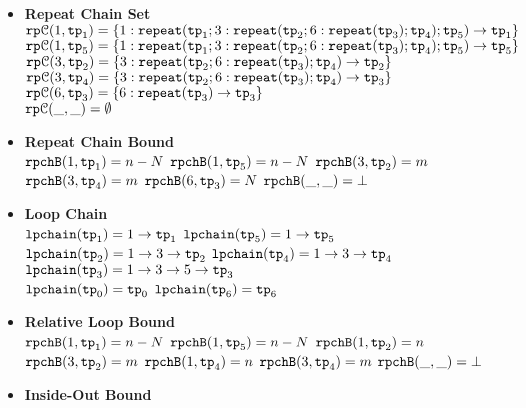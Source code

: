 \begin{enumerate}
{\begin{itemize}
  \item \textbf{Repeat Chain Set}
  \\
  $\mathtt{rp}\mathcal{C}(1, \mathtt{tp}_1) = 
  \{1: \mathtt{repeat}(\mathtt{tp}_1; 3: \mathtt{repeat}(\mathtt{tp}_2; 6 : \mathtt{repeat}(\mathtt{tp}_3); \mathtt{tp}_4); \mathtt{tp}_5) \to \mathtt{tp}_1\}$
  \\
  $\mathtt{rp}\mathcal{C}(1, \mathtt{tp}_5) = \{1: \mathtt{repeat}(\mathtt{tp}_1; 3: \mathtt{repeat}(\mathtt{tp}_2; 6 : \mathtt{repeat}(\mathtt{tp}_3); \mathtt{tp}_4); \mathtt{tp}_5) \to \mathtt{tp}_5\}$
  \\
  $\mathtt{rp}\mathcal{C}(3, \mathtt{tp}_2) = \{3: \mathtt{repeat}(\mathtt{tp}_2; 6 : \mathtt{repeat}(\mathtt{tp}_3); \mathtt{tp}_4) \to \mathtt{tp}_2\}$
  \\
  $\mathtt{rp}\mathcal{C}(3, \mathtt{tp}_4) = \{3: \mathtt{repeat}(\mathtt{tp}_2; 6 : \mathtt{repeat}(\mathtt{tp}_3); \mathtt{tp}_4) \to \mathtt{tp}_3\}$
  \\
  $\mathtt{rp}\mathcal{C}(6, \mathtt{tp}_3) = \{6: \mathtt{repeat}(\mathtt{tp}_3) \to \mathtt{tp}_3\}$
  \\
  $\mathtt{rp}\mathcal{C}(\_, \_) = \emptyset$ 
  \item \textbf{Repeat Chain Bound}
  \\
  $\mathtt{rpchB}(1, \mathtt{tp}_1) = n - N$ \quad
  $\mathtt{rpchB}(1, \mathtt{tp}_5) = n - N$ \quad
  $\mathtt{rpchB}(3, \mathtt{tp}_2) = m$ \\
  $\mathtt{rpchB}(3, \mathtt{tp}_4) = m$ \quad
  $\mathtt{rpchB}(6, \mathtt{tp}_3) = N$ \quad \quad 
  $\mathtt{rpchB}(\_, \_) = \bot $ 
  \item \textbf{Loop Chain}
  \\
  $\mathtt{lpchain}(\mathtt{tp}_1) = 1\to \mathtt{tp}_1$ \quad
  $\mathtt{lpchain}(\mathtt{tp}_5) = 1\to \mathtt{tp}_5$ \quad
  $\mathtt{lpchain}(\mathtt{tp}_2) = 1 \to 3 \to \mathtt{tp}_2$ \quad
  $\mathtt{lpchain}(\mathtt{tp}_4) = 1 \to 3 \to \mathtt{tp}_4$ \quad
  \highlight
  {$\mathtt{lpchain}(\mathtt{tp}_3) = 1 \to 3 \to 5 \to \mathtt{tp}_3$ }\\
  $\mathtt{lpchain}(\mathtt{tp}_0) = \mathtt{tp}_0$ \quad
  $\mathtt{lpchain}(\mathtt{tp}_6) = \mathtt{tp}_6$ 
  \item \textbf{{Relative Loop Bound}}
  \\
  $\mathtt{rpchB}(1, \mathtt{tp}_1) = n - N$ \quad
  $\mathtt{rpchB}(1, \mathtt{tp}_5) = n - N$ \quad
  $\mathtt{rpchB}(1, \mathtt{tp}_2) = n$ \quad $\mathtt{rpchB}(3, \mathtt{tp}_2) = m$ \quad
  $\mathtt{rpchB}(1, \mathtt{tp}_4) = n$ \quad $\mathtt{rpchB}(3, \mathtt{tp}_4) = m$ \quad
   \quad
  $\mathtt{rpchB}(\_, \_) = \bot $ 
  \item \textbf{Inside-Out Bound}
  \\

\end{itemize}}
\end{enumerate}

